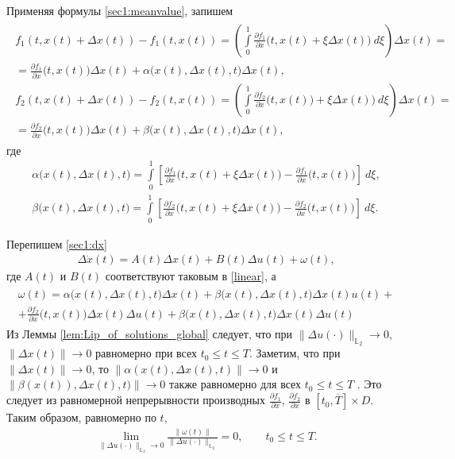 \documentclass[../main.tex]{subfiles}
\begin{document}
	Применяя формулы  \eqref{sec1:meanvalue}, запишем 
	\begin{gather*}
		\begin{gathered}
			f_1(t, x(t)+\Delta x(t)) - f_1(t, x(t)) = \left(  \int\limits_0^1 \frac{\partial f_1}{\partial x} \Big(t, x(t) + \xi \Delta x(t)\Big) \ d\xi \right) \Delta x(t) =  \\  = \frac{\partial f_1}{\partial x} \Big(t, x(t)\Big)  \Delta x(t) + \alpha\Big(x(t),\Delta x(t), t\Big) \Delta x(t), \\ 
			f_2(t, x(t)+\Delta x(t)) - f_2(t, x(t)) = \left(  \int\limits_0^1 \frac{\partial f_2}{\partial x} \Big(t, x(t)) + \xi \Delta x(t)\Big) \ d\xi \right) \Delta x(t)=  \\  = \frac{\partial f_2}{\partial x} \Big(t, x(t)\Big)  \Delta x(t) + \beta\Big(x(t),\Delta x(t), t\Big) \Delta x(t), 
		\end{gathered}
	\end{gather*}
	где 
	\begin{gather*}
		\alpha\Big(x(t),\Delta x(t), t\Big) = 
		  \int\limits_0^1 \left[ \frac{\partial f_1}{\partial x} \Big(t, x(t) + \xi \Delta x(t)\Big)  - \frac{\partial f_1}{\partial x} \Big(t, x(t)\Big)  \right] \ d\xi ,\\
		\beta\Big(x(t),\Delta x(t), t\Big) = 
		  \int\limits_0^1 \left[ \frac{\partial f_2}{\partial x} \Big(t, x(t) + \xi \Delta x(t)\Big)  - \frac{\partial f_2}{\partial x} \Big(t, x(t)\Big)  \right] \ d\xi.
	\end{gather*}
	
	Перепишем \eqref{sec1:dx}
	\begin{gather}\label{sec1:dx1}
		\Delta \dot{x}(t) =
		A(t) \Delta x(t)  + 
		B(t) \Delta u(t)  + 
		\omega(t),
	\end{gather}
	где $A(t)$ и $B(t)$ соответствуют таковым в \eqref{linear}, а
	\begin{gather*}
		\begin{gathered}
			\omega(t) = 
			 \alpha\big(x(t),\Delta x(t), t\big) \Delta x(t)  + 
			 \beta\big(x(t),\Delta x(t), t\big)  \Delta x(t) u(t)  + \\ +
			  \frac{\partial f_2}{\partial x} \Big(t, x(t)\Big) \Delta x(t) \Delta u(t) + 
			  \beta\Big(x(t),\Delta x(t), t\Big) \Delta x(t) \Delta u(t) 
		\end{gathered}	
	\end{gather*}
	Из Леммы \ref{lem:Lip_of_solutions_global} следует, что при $\|\Delta u(\cdot)\|_{\mathbb{L}_2} \to 0$, $\|\Delta x(t)\| \to 0$ равномерно при всех $t_0 \leqslant t \leqslant T$.  Заметим, что при $\|\Delta x(t)\| \to 0$, то $	 \left\|  \alpha(x(t),\Delta x(t), t) \right\|  \to 0 $ и $ \left\|  \beta(x(t)),\Delta x(t), t) \right\|  \to 0 $ также равномерно для всех  $ t_0 \leqslant t \leqslant T $ . Это следует из равномерной непрерывности производных $\frac{\partial f_1}{\partial x}$, $\frac{\partial f_2}{\partial x}$ в $[t_0, \overline{T}] \times D$.  Таким образом, равномерно по $t$,
	\begin{gather}\label{lim_omega}
		\lim\limits_{\|\Delta u(\cdot) \|_{\mathbb{L}_2} \to 0}  \frac{ \| \omega(t) \| }{\|\Delta u(\cdot) \|_{\mathbb{L}_2}}  = 0, \qquad  t_0 \leqslant t \leqslant T .
	\end{gather}
	
\end{document}
